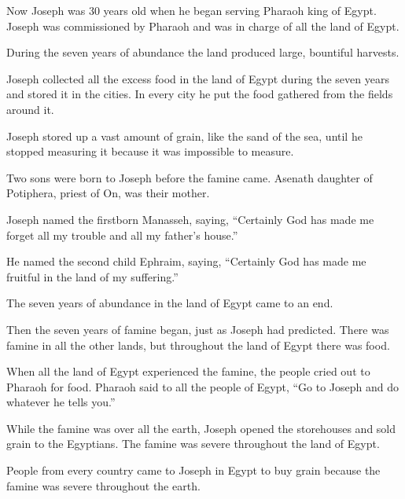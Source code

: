 \begin{scripture}
 Now Joseph was 30 years old when he began serving Pharaoh king of Egypt. Joseph was commissioned by Pharaoh and was in charge of all the land of Egypt.
 During the seven years of abundance the land produced large, bountiful harvests.
 Joseph collected all the excess food in the land of Egypt during the seven years and stored it in the cities. In every city he put the food gathered from the fields around it.
 Joseph stored up a vast amount of grain, like the sand of the sea, until he stopped measuring it because it was impossible to measure.
\everypar{}

 Two sons were born to Joseph before the famine came. Asenath daughter of Potiphera, priest of On, was their mother.
 Joseph named the firstborn Manasseh, saying, ``Certainly God has made me forget all my trouble and all my father's house.''
 He named the second child Ephraim, saying, ``Certainly God has made me fruitful in the land of my suffering.''
\everypar{}

 The seven years of abundance in the land of Egypt came to an end.
 Then the seven years of famine began, just as Joseph had predicted. There was famine in all the other lands, but throughout the land of Egypt there was food.
 When all the land of Egypt experienced the famine, the people cried out to Pharaoh for food. Pharaoh said to all the people of Egypt, ``Go to Joseph and do whatever he tells you.''
\everypar{}

 While the famine was over all the earth, Joseph opened the storehouses and sold grain to the Egyptians. The famine was severe throughout the land of Egypt.
 People from every country came to Joseph in Egypt to buy grain because the famine was severe throughout the earth.


\end{scripture}
